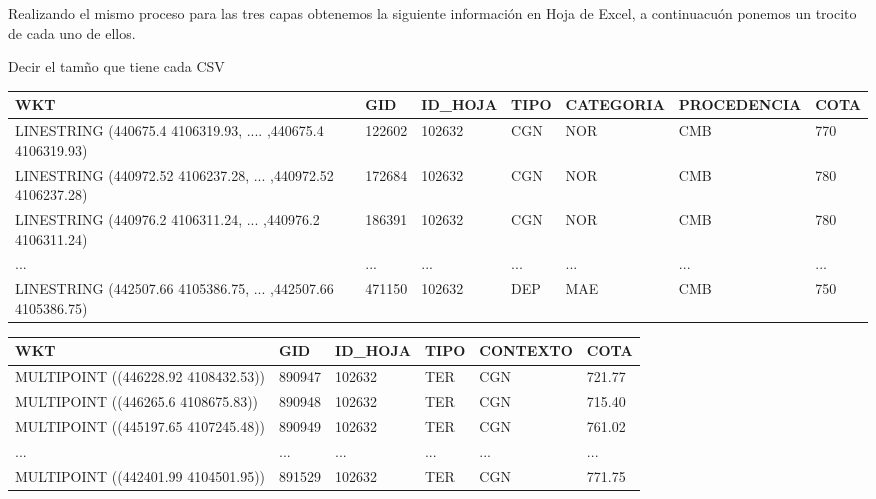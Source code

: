 Realizando el mismo proceso para las tres capas obtenemos la siguiente información en Hoja de Excel, a continuacuón ponemos un trocito de cada uno de ellos.

Decir el tamño que tiene cada CSV

\begin{table}[H]
	\begin{tabular}{|l|l|l|l|l|l|l|}
		\hline
		\rowcolor[HTML]{EFEFEF} 
		\textbf{WKT} & \textbf{GID} & \textbf{ID\_HOJA} & \textbf{TIPO} & \textbf{CATEGORIA} & \textbf{PROCEDENCIA} & \textbf{COTA} \\ \hline
		LINESTRING (440675.4 4106319.93, .... ,440675.4 4106319.93)       & 122602       & 102632            & CGN           & NOR                & CMB                 & 770           \\ \hline
		LINESTRING (440972.52 4106237.28, ... ,440972.52 4106237.28)     & 172684       & 102632            & CGN           & NOR                & CMB                 & 780           \\ \hline
		LINESTRING (440976.2 4106311.24, ... ,440976.2 4106311.24)              & 186391       & 102632            & CGN           & NOR                & CMB                 & 780           \\ \hline
	...                                & ...       & ...            & ...           & ...                & ...                 & ...           \\ \hline
	
	LINESTRING (442507.66 4105386.75, ... ,442507.66 4105386.75)             & 471150       & 102632            & DEP           & MAE                & CMB                 & 750           \\ \hline
	\end{tabular}
\end{table}

\begin{table}[H]
	\begin{tabular}{|l|l|l|l|l|l|}
		\hline
		\rowcolor[HTML]{EFEFEF} 
		\textbf{WKT}                        & \textbf{GID} & \textbf{ID\_HOJA} & \textbf{TIPO} & \textbf{CONTEXTO} & \textbf{COTA} \\ \hline
		MULTIPOINT ((446228.92 4108432.53)) & 890947       & 102632            & TER           & CGN               & 721.77        \\ \hline
		MULTIPOINT ((446265.6 4108675.83))  & 890948       & 102632            & TER           & CGN               & 715.40        \\ \hline
		MULTIPOINT ((445197.65 4107245.48)) & 890949       & 102632            & TER           & CGN               & 761.02        \\ \hline
		...  & ...       & ...            & ...           & ...               &...        \\ \hline
		MULTIPOINT ((442401.99 4104501.95)) & 891529       & 102632            & TER           & CGN               & 771.75        \\ \hline
	\end{tabular}
\end{table}


